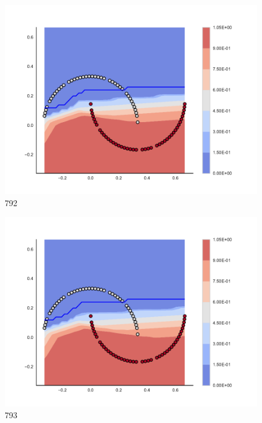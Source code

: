 \begin{subfigure}[b]{0.09\textwidth}
    \includegraphics[clip, trim=2.35cm 1.75cm 4.5cm 0cm,width=\textwidth]{img/convergence/792.pdf}
    \caption{792}
    \label{fig:convergence_792}
\end{subfigure}
%
\begin{subfigure}[b]{0.09\textwidth}
    \includegraphics[clip, trim=2.35cm 1.75cm 4.5cm 0cm,width=\textwidth]{img/convergence/793.pdf}
    \caption{793}
    \label{fig:convergence_793}
\end{subfigure}
%
